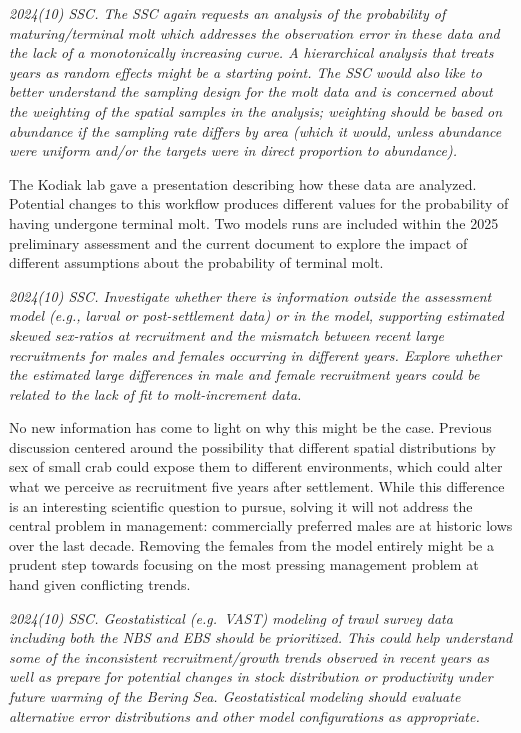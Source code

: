 \documentclass[
]{article}
\begin{document}
\emph{2024(10) SSC. The SSC again requests an analysis of the probability of maturing/terminal molt which addresses the observation error in these data and the lack of a monotonically increasing curve. A hierarchical analysis that treats years as random effects might be a starting point. The SSC would also like to better understand the sampling design for the molt data and is concerned about the weighting of the spatial samples in the analysis; weighting should be based on abundance if the sampling rate differs by area (which it would, unless abundance were uniform and/or the targets were in direct proportion to abundance).}

The Kodiak lab gave a presentation describing how these data are analyzed. Potential changes to this workflow produces different values for the probability of having undergone terminal molt. Two models runs are included within the 2025 preliminary assessment and the current document to explore the impact of different assumptions about the probability of terminal molt.

\emph{2024(10) SSC. Investigate whether there is information outside the assessment model (e.g., larval or post-settlement data) or in the model, supporting estimated skewed sex-ratios at recruitment and the mismatch between recent large recruitments for males and females occurring in different years. Explore whether the estimated large differences in male and female recruitment years could be related to the lack of fit to molt-increment data.}

No new information has come to light on why this might be the case. Previous discussion centered around the possibility that different spatial distributions by sex of small crab could expose them to different environments, which could alter what we perceive as recruitment five years after settlement. While this difference is an interesting scientific question to pursue, solving it will not address the central problem in management: commercially preferred males are at historic lows over the last decade. Removing the females from the model entirely might be a prudent step towards focusing on the most pressing management problem at hand given conflicting trends.

\emph{2024(10) SSC. Geostatistical (e.g.~VAST) modeling of trawl survey data including both the NBS and EBS should be prioritized. This could help understand some of the inconsistent recruitment/growth trends observed in recent years as well as prepare for potential changes in stock distribution or productivity under future warming of the Bering Sea. Geostatistical modeling should evaluate alternative error distributions and other model configurations as appropriate.}
\end{document}
